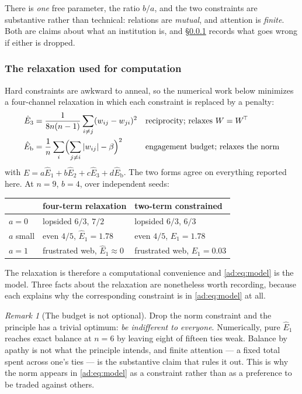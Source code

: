 \documentclass[11pt]{article}
\numberwithin{equation}{section}
\theoremstyle{plain}
\theoremstyle{definition}
\theoremstyle{remark}
\newtheorem{remark}[theorem]{Remark}
\begin{document}
There is \emph{one} free parameter, the ratio $b/a$, and the two
constraints are substantive rather than technical: relations are
\emph{mutual}, and attention is \emph{finite}. Both are claims about
what an institution is, and \S\ref{ad:subsub:relaxation} records what
goes wrong if either is dropped.

\subsubsection{The relaxation used for computation}
\label{ad:subsub:relaxation}

Hard constraints are awkward to anneal, so the numerical work below
minimizes a four-channel relaxation in which each constraint is
replaced by a penalty:
\begin{align}
\hat E_3&=\frac{1}{8n(n-1)}\sum_{i\ne j}(w_{ij}-w_{ji})^{2}
&&\text{reciprocity; relaxes } W=W^{\!\top}\label{ad:eq:E3}\\
\hat E_{\mathrm b}&=\frac1n\sum_i\Bigl(\sum_{j\ne i}|w_{ij}|-\beta\Bigr)^{2}
&&\text{engagement budget; relaxes the norm}\label{ad:eq:Eb}
\end{align}
with $E=a\hat E_1+b\hat E_2+c\hat E_3+d\hat E_{\mathrm b}$. The two forms
agree on everything reported here. At $n=9$, $b=4$, over independent
seeds:
\begin{center}\small
\begin{tabular}{@{}lll@{}}
\toprule
& four-term relaxation & two-term constrained\\
\midrule
$a=0$ & lopsided $6/3$, $7/2$ & lopsided $6/3$, $6/3$\\
$a$ small & even $4/5$, $\hat E_1=1.78$ & even $4/5$, $E_1=1.78$\\
$a=1$ & frustrated web, $\hat E_1\approx0$ & frustrated web, $E_1=0.03$\\
\bottomrule
\end{tabular}
\end{center}
The relaxation is therefore a computational convenience and
\eqref{ad:eq:model} is the model. Three facts about the relaxation are
nonetheless worth recording, because each explains why the
corresponding constraint is in \eqref{ad:eq:model} at all.

\begin{remark}[The budget is not optional]\label{ad:rem:apathy}
Drop the norm constraint and the principle has a trivial optimum:
\emph{be indifferent to everyone}. Numerically, pure $\hat E_1$ reaches
exact balance at $n=6$ by leaving eight of fifteen ties weak. Balance by
apathy is not what the principle intends, and finite attention --- a
fixed total spent across one's ties --- is the substantive claim that
rules it out. This is why the norm appears in \eqref{ad:eq:model} as a
constraint rather than as a preference to be traded against others.
\end{remark}
\end{document}

